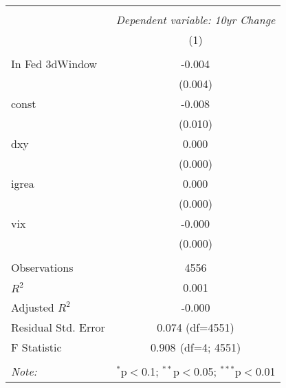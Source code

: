\begin{table}[!htbp] \centering
\begin{tabular}{@{\extracolsep{5pt}}lc}
\\[-1.8ex]\hline
\hline \\[-1.8ex]
& \multicolumn{1}{c}{\textit{Dependent variable: 10yr Change}} \
\cr \cline{2-2}
\\[-1.8ex] & (1) \\
\hline \\[-1.8ex]
 In Fed 3dWindow & -0.004$^{}$ \\
& (0.004) \\
 const & -0.008$^{}$ \\
& (0.010) \\
 dxy & 0.000$^{}$ \\
& (0.000) \\
 igrea & 0.000$^{}$ \\
& (0.000) \\
 vix & -0.000$^{}$ \\
& (0.000) \\
\hline \\[-1.8ex]
 Observations & 4556 \\
 $R^2$ & 0.001 \\
 Adjusted $R^2$ & -0.000 \\
 Residual Std. Error & 0.074 (df=4551) \\
 F Statistic & 0.908$^{}$ (df=4; 4551) \\
\hline
\hline \\[-1.8ex]
\textit{Note:} & \multicolumn{1}{r}{$^{*}$p$<$0.1; $^{**}$p$<$0.05; $^{***}$p$<$0.01} \\
\end{tabular}
\end{table}